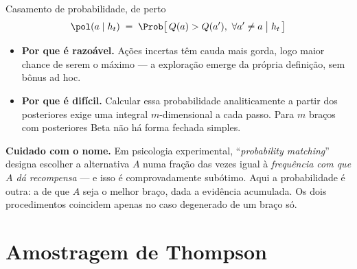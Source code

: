\documentclass[aspectratio=169, 11pt]{beamer}
\newcommand{\hist}{h_t}
\begin{document}
\begin{frame}{Casamento de probabilidade, de perto}
  \[
    \pol(a \mid \hist)
    \;=\; \Prob\big[\,Q(a) > Q(a'),\ \forall a' \neq a \;\big|\; \hist \,\big]
  \]

  \begin{itemize}
    \item \textbf{Por que é razoável.} Ações incertas têm cauda mais gorda,
          logo maior chance de serem o máximo — a exploração emerge da
          própria definição, sem bônus ad hoc.
    \item \textbf{Por que é difícil.} Calcular essa probabilidade
          analiticamente a partir dos posteriores exige uma integral
          $m$-dimensional a cada passo. Para $m$ braços com posteriores
          Beta não há forma fechada simples.
  \end{itemize}

  \begin{alertabox}
    \textbf{Cuidado com o nome.} Em psicologia experimental,
    ``\emph{probability matching}'' designa escolher a alternativa $A$ numa
    fração das vezes igual à \emph{frequência com que $A$ dá recompensa} —
    e isso é comprovadamente subótimo. Aqui a probabilidade é outra: a de
    que $A$ seja o \alert{melhor braço}, dada a evidência acumulada. Os
    dois procedimentos coincidem apenas no caso degenerado de um braço só.
  \end{alertabox}
\end{frame}

\section{Amostragem de Thompson}
\end{document}
